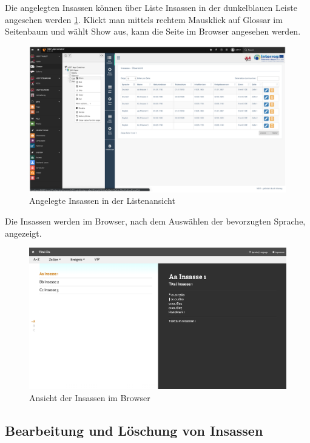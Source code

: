 Die angelegten Insassen können über Liste Insassen in der dunkelblauen Leiste angesehen werden \ref{img:angelegte_insassen_listenuebersicht}. Klickt man mittels rechtem Mausklick auf Glossar im Seitenbaum und wählt Show aus, kann die Seite im Browser angesehen werden.
\begin{figure}[ht!]
\centering
\includegraphics[width=12cm]{Figures/paula/glossar/angelegte_insassen_listenuebersicht.png}
\caption{Angelegte Insassen in der Listenansicht}
\label{img:angelegte_insassen_listenuebersicht}
\end{figure}
Die Insassen werden im Browser, nach dem Auswählen der bevorzugten Sprache, angezeigt.
\begin{figure}[ht!]
\centering
\includegraphics[width=12cm]{Figures/paula/glossar/insassenuebersicht_browser.png}
\caption{Ansicht der Insassen im Browser}
\label{img:insassenuebersicht_browser}
\end{figure}

\subsection{Bearbeitung und Löschung von Insassen}







